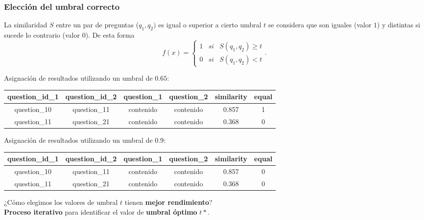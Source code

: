 \begin{frame}[allowframebreaks]
	\frametitle{Elección del umbral correcto}
	La similaridad \(S\) entre un par de preguntas (\(q_1,q_2)\) es igual o superior a cierto umbral \(t\) se considera que son iguales (valor \(1\)) y distintas si sucede lo contrario (valor \(0\)). De esta forma
	\[f(x) = \left\{ \begin{array}{lcc} 1 & si & S(q_1, q_2)\geq t
		\\ 0 & si & S(q_1, q_2) < t
	\end{array} \right..\]

	\framebreak

	Asignación de resultados utilizando un umbral de \(0.65\):
	\begin{table}[h!]
		\scriptsize
		\begin{tabularx}{\textwidth}{cccccc}
			\toprule
			\textbf{question\_id\_1} & \textbf{question\_id\_2} & \textbf{question\_1} & \textbf{question\_2}  & \textbf{similarity} & \textbf{equal} \\
			\midrule
			question\_10             & question\_11             & contenido            & contenido            & 0.857  & 1              \\
			question\_11             & question\_21             & contenido            & contenido            & 0.368  & 0              \\
			\bottomrule
		\end{tabularx}
		\label{tab:umbral-validacion-1}
	\end{table}

	Asignación de resultados utilizando un umbral de \(0.9\):
	\begin{table}[h!]
		\scriptsize
		\begin{tabularx}{\textwidth}{cccccc}
			\toprule
			\textbf{question\_id\_1} & \textbf{question\_id\_2} & \textbf{question\_1} & \textbf{question\_2}  & \textbf{similarity} & \textbf{equal} \\
			\midrule
			question\_10             & question\_11             & contenido            & contenido            & 0.857 & 0              \\
			question\_11             & question\_21             & contenido            & contenido            & 0.368 & 0              \\
			\bottomrule
		\end{tabularx}
		\label{tab:umbral-validacion-2}
	\end{table}

	\begin{center}
		¿Cómo elegimos los valores de umbral \(t\) tienen \textbf{mejor rendimiento}? \\
		\bigskip
		\textbf{Proceso iterativo} para identificar el valor de \textbf{umbral óptimo} \(t*\).
	\end{center}
\end{frame}